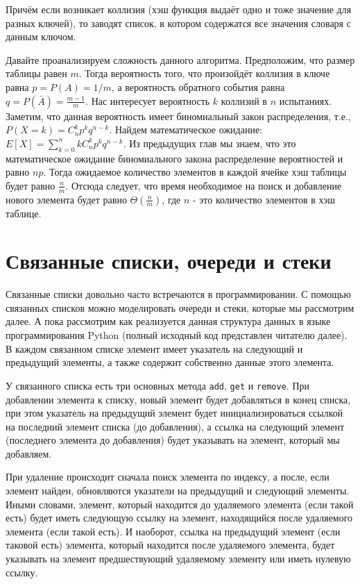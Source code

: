 Причём если возникает коллизия (хэш функция выдаёт одно и тоже значение для разных 
ключей), то заводят список, в котором содержатся все значения словаря с данным ключом.

Давайте проанализируем сложность данного алгоритма. Предположим, что 
размер таблицы равен $m$. Тогда вероятность того, что произойдёт коллизия в 
ключе равна $p=P(A)=1/m$, а вероятность обратного события равна $q=P(\bar{A})=\frac{m-1}{m}$.
Нас интересует вероятность $k$ коллизий в $n$ испытаниях. Заметим, что данная вероятность 
имеет биномиальный закон распределения, т.е., $P(X=k) = C_n^kp^kq^{n-k}$. 
Найдем математическое ожидание: $E[X]=\sum_{k=0}^nkC_n^kp^kq^{n-k}$. Из 
предыдущих глав мы знаем, что это математическое ожидание биномиального
закона распределение вероятностей и равно $np$.
Тогда ожидаемое количество элементов в каждой ячейке хэш таблицы будет 
равно $\frac{n}{m}$. Отсюда следует, что время необходимое на поиск 
и добавление нового элемента будет равно $\Theta(\frac{n}{m})$,
где $n$ - это количество элементов в хэш таблице.

\section{Связанные списки, очереди и стеки}

Связанные списки довольно часто встречаются в программировании. 
С помощью связанных списков можно моделировать очереди и стеки,
которые мы рассмотрим далее. А пока рассмотрим как реализуется 
данная структура данных в языке программирования Python 
(полный исходный код представлен читателю далее). В каждом 
связанном списке элемент имеет указатель на следующий 
и предыдущий элементы, а также содержит собственно данные этого элемента.

У связанного списка есть три основных метода \texttt{add}, 
\texttt{get} и \texttt{remove}. 
При добавлении элемента к списку, новый элемент будет добавляться в конец списка,
при этом указатель на предыдущий элемент будет инициализироваться 
ссылкой на последний элемент списка (до добавления), а ссылка на следующий 
элемент (последнего элемента до добавления) будет 
указывать на элемент, который мы добавляем.

При удаление происходит сначала поиск элемента по индексу, 
а после, если элемент найден, обновляются указатели на предыдущий 
и следующий элементы. Иными словами, элемент, который находится 
до удаляемого элемента (если такой есть) будет иметь следующую ссылку 
на элемент, находящийся после удаляемого элемента (если такой есть). И наоборот, 
ссылка на предыдущий элемент (если таковой есть) элемента, который 
находится после удаляемого элемента, будет указывать 
на элемент предшествующий удаляемому элементу или иметь нулевую ссылку. 

